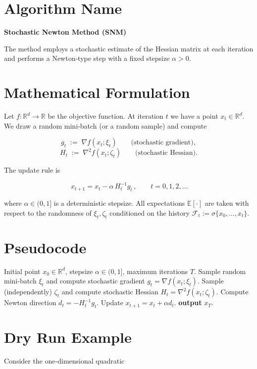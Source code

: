 \documentclass[11pt]{article}
\newcommand{\E}{\mathbb{E}}
\newcommand{\R}{\mathbb{R}}
\begin{document}
\section*{Algorithm Name}
\textbf{Stochastic Newton Method (SNM)}  

The method employs a stochastic estimate of the Hessian matrix at each iteration and performs a Newton‑type step with a fixed stepsize $\alpha>0$.

\section*{Mathematical Formulation}
Let $f:\R^{d}\rightarrow\R$ be the objective function.  
At iteration $t$ we have a point $x_{t}\in\R^{d}$.  
We draw a random mini‑batch (or a random sample) and compute  

\[
g_{t}\;:=\;\nabla f(x_{t};\xi_{t})\qquad\text{(stochastic gradient)},
\]
\[
H_{t}\;:=\;\nabla^{2} f(x_{t};\zeta_{t})\qquad\text{(stochastic Hessian)} .
\]

The update rule is  

\[
\boxed{\,x_{t+1}=x_{t}-\alpha\,H_{t}^{-1}g_{t}\,},\qquad t=0,1,2,\dots
\]

where $\alpha\in(0,1]$ is a deterministic stepsize.  
All expectations $\E[\cdot]$ are taken with respect to the randomness of
$\xi_{t},\zeta_{t}$ conditioned on the history $\mathcal{F}_{t}:=
\sigma\{x_{0},\dots ,x_{t}\}$.

\section*{Pseudocode}
\begin{algorithm}[H]
\caption{Stochastic Newton Method}
\begin{algorithmic}[1]
\Require Initial point $x_{0}\in\R^{d}$, stepsize $\alpha\in(0,1]$, 
maximum iterations $T$.
    \State Sample random mini‑batch $\xi_{t}$ and compute stochastic gradient 
          $g_{t}= \nabla f(x_{t};\xi_{t})$.
    \State Sample (independently) $\zeta_{t}$ and compute stochastic Hessian 
          $H_{t}= \nabla^{2} f(x_{t};\zeta_{t})$.
    \State Compute Newton direction $d_{t}= - H_{t}^{-1} g_{t}$.
    \State Update $x_{t+1}=x_{t}+ \alpha d_{t}$.
\EndFor
\State \textbf{output} $x_{T}$.
\end{algorithmic}
\end{algorithm}

\section*{Dry Run Example}
Consider the one‑dimensional quadratic  
\end{document}
